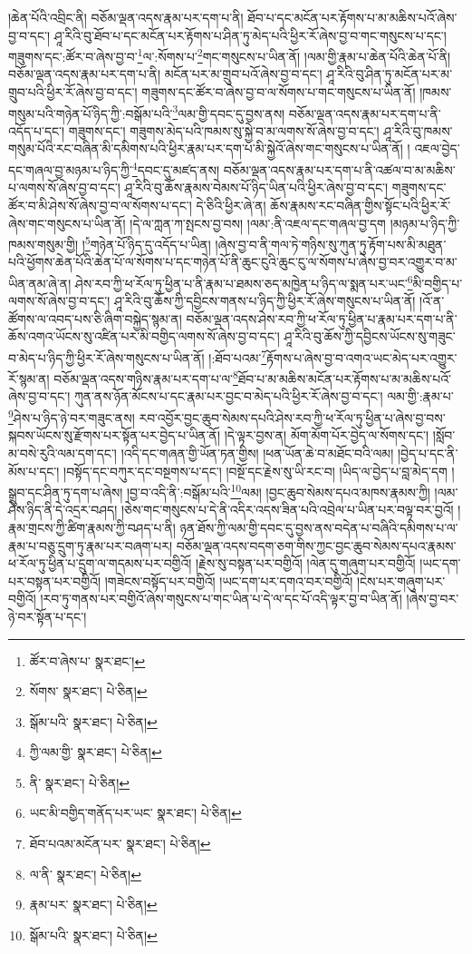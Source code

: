 །ཆེན་པོའི་འབྲིང་ནི། བཅོམ་ལྡན་འདས་རྣམ་པར་དག་པ་ནི། ཐོབ་པ་དང་མངོན་པར་རྟོགས་པ་མ་མཆིས་པའོ་ཞེས་བྱ་བ་དང་། ཤཱ་རིའི་བུ་ཐོབ་པ་དང་མངོན་པར་རྟོགས་པ་ཤིན་ཏུ་མེད་པའི་ཕྱིར་རོ་ཞེས་བྱ་བ་གང་གསུངས་པ་དང་། གཟུགས་དང་:ཚོར་བ་ཞེས་བྱ་བ་\footnote{ཚོར་བ་ཞེས་པ་  སྣར་ཐང་། }ལ་:སོགས་པ་\footnote{སོགས་  སྣར་ཐང་།  པེ་ཅིན། }གང་གསུངས་པ་ཡིན་ནོ། །ལམ་གྱི་རྣམ་པ་ཆེན་པོའི་ཆེན་པོ་ནི། བཅོམ་ལྡན་འདས་རྣམ་པར་དག་པ་ནི། མངོན་པར་མ་གྲུབ་པའོ་ཞེས་བྱ་བ་དང་། ཤཱ་རིའི་བུ་ཤིན་ཏུ་མངོན་པར་མ་གྲུབ་པའི་ཕྱིར་རོ་ཞེས་བྱ་བ་དང་། གཟུགས་དང་ཚོར་བ་ཞེས་བྱ་བ་ལ་སོགས་པ་གང་གསུངས་པ་ཡིན་ནོ། །ཁམས་གསུམ་པའི་གཉེན་པོ་ཉིད་ཀྱི་:བསྒོམ་པའི་\footnote{སྒོམ་པའི་  སྣར་ཐང་།  པེ་ཅིན། }ལམ་གྱི་དབང་དུ་བྱས་ནས། བཅོམ་ལྡན་འདས་རྣམ་པར་དག་པ་ནི་འདོད་པ་དང་། གཟུགས་དང་། གཟུགས་མེད་པའི་ཁམས་སུ་སྐྱེ་བ་མ་ལགས་སོ་ཞེས་བྱ་བ་དང་། ཤཱ་རིའི་བུ་ཁམས་གསུམ་པོའི་རང་བཞིན་མི་དམིགས་པའི་ཕྱིར་རྣམ་པར་དག་པ་མི་སྐྱེའོ་ཞེས་གང་གསུངས་པ་ཡིན་ནོ། །
འཇལ་བྱེད་དང་གཞལ་བྱ་མཉམ་པ་ཉིད་ཀྱི་\footnote{ཀྱི་ལམ་གྱི་  སྣར་ཐང་།  པེ་ཅིན། }དབང་དུ་མཛད་ནས། བཅོམ་ལྡན་འདས་རྣམ་པར་དག་པ་ནི་འཚལ་བ་མ་མཆིས་པ་ལགས་སོ་ཞེས་བྱ་བ་དང་། ཤཱ་རིའི་བུ་ཆོས་རྣམས་བེམས་པོ་ཉིད་ཡིན་པའི་ཕྱིར་ཞེས་བྱ་བ་དང་། གཟུགས་དང་ཚོར་བ་མི་ཤེས་སོ་ཞེས་བྱ་བ་ལ་སོགས་པ་དང་། དེ་ཅིའི་ཕྱིར་ཞེ་ན། ཆོས་རྣམས་རང་བཞིན་གྱིས་སྟོང་པའི་ཕྱིར་རོ་ཞེས་གང་གསུངས་པ་ཡིན་ནོ། །དེ་ལ་ཀླན་ཀ་སྤངས་བྱ་བས། །ལམ་:ནི་འཇལ་དང་གཞལ་བྱ་དག །མཉམ་པ་ཉིད་ཀྱི་ཁམས་གསུམ་གྱི། །\footnote{ནི་  སྣར་ཐང་།  པེ་ཅིན། }གཉེན་པོ་ཉིད་དུ་འདོད་པ་ཡིན། །ཞེས་བྱ་བ་ནི་གལ་ཏེ་གཉིས་སུ་ཀུན་ཏུ་རྟོག་པས་མི་མཐུན་པའི་ཕྱོགས་ཆེན་པོའི་ཆེན་པོ་ལ་སོགས་པ་དང་གཉེན་པོ་ནི་ཆུང་ངུའི་ཆུང་ངུ་ལ་སོགས་པ་ཞེས་བྱ་བར་འགྱུར་བ་མ་ཡིན་ནམ་ཞེ་ན། ཤེས་རབ་ཀྱི་ཕ་རོལ་ཏུ་ཕྱིན་པ་ནི་རྣམ་པ་ཐམས་ཅད་མཁྱེན་པ་ཉིད་ལ་སྨན་པར་ཡང་\footnote{ཡང་མི་བགྱིད་གནོད་པར་ཡང་  སྣར་ཐང་།  པེ་ཅིན། }མི་བགྱིད་པ་ལགས་སོ་ཞེས་བྱ་བ་དང་། ཤཱ་རིའི་བུ་ཆོས་ཀྱི་དབྱིངས་གནས་པ་ཉིད་ཀྱི་ཕྱིར་རོ་ཞེས་གསུངས་པ་ཡིན་ནོ། །འོ་ན་ཚོགས་ལ་འབད་པས་ཅི་ཞིག་བསྐྱེད་སྙམ་ན། བཅོམ་ལྡན་འདས་ཤེས་རབ་ཀྱི་ཕ་རོལ་ཏུ་ཕྱིན་པ་རྣམ་པར་དག་པ་ནི་ཆོས་འགའ་ཡོངས་སུ་འཛིན་པར་མི་བགྱིད་ལགས་སོ་ཞེས་བྱ་བ་དང་། ཤཱ་རིའི་བུ་ཆོས་ཀྱི་དབྱིངས་ཡོངས་སུ་གཟུང་བ་མེད་པ་ཉིད་ཀྱི་ཕྱིར་རོ་ཞེས་གསུངས་པ་ཡིན་ནོ། །:ཐོབ་པའམ་\footnote{ཐོབ་པའམ་མངོན་པར་  སྣར་ཐང་།  པེ་ཅིན། }རྟོགས་པ་ཞེས་བྱ་བ་འགའ་ཡང་མེད་པར་འགྱུར་རོ་སྙམ་ན། བཅོམ་ལྡན་འདས་གཉིས་རྣམ་པར་དག་པ་ལ་\footnote{ལ་ནི་  སྣར་ཐང་།  པེ་ཅིན། }ཐོབ་པ་མ་མཆིས་མངོན་པར་རྟོགས་པ་མ་མཆིས་པའོ་ཞེས་བྱ་བ་དང་། ཀུན་ནས་ཉོན་མོངས་པ་དང་རྣམ་པར་བྱང་བ་མེད་པའི་ཕྱིར་རོ་ཞེས་བྱ་བ་དང་། ལམ་གྱི་:རྣམ་པ་\footnote{རྣམ་པར་  སྣར་ཐང་།  པེ་ཅིན། }ཤེས་པ་ཉིད་ཉེ་བར་གཟུང་ནས། རབ་འབྱོར་བྱང་ཆུབ་སེམས་དཔའི་ཤེས་རབ་ཀྱི་ཕ་རོལ་ཏུ་ཕྱིན་པ་ཞེས་བྱ་བས་སྐབས་ཡོངས་སུ་རྫོགས་པར་སྟོན་པར་བྱེད་པ་ཡིན་ནོ། །དེ་ལྟར་བྱས་ན། མོག་མོག་པོར་བྱེད་ལ་སོགས་དང་། །སློབ་མ་བསེ་རུའི་ལམ་དག་དང་། །འདི་དང་གཞན་གྱི་ཡོན་ཏན་གྱིས། །ཕན་ཡོན་ཆེ་བ་མཐོང་བའི་ལམ། །བྱེད་པ་དང་ནི་མོས་པ་དང་། །བསྟོད་དང་བཀུར་དང་བསྔགས་པ་དང་། །བསྔོ་དང་རྗེས་སུ་ཡི་རང་བ། །ཡིད་ལ་བྱེད་པ་བླ་མེད་དག །སྒྲུབ་དང་ཤིན་ཏུ་དག་པ་ཞེས། །བྱ་བ་འདི་ནི་:བསྒོམ་པའི་\footnote{སྒོམ་པའི་  སྣར་ཐང་།  པེ་ཅིན། }ལམ། །བྱང་ཆུབ་སེམས་དཔའ་མཁས་རྣམས་ཀྱི། །ལམ་ཤེས་ཉིད་ནི་དེ་འདྲར་བཤད། །ཅེས་གང་གསུངས་པ་དེ་ནི་འདིར་འདས་ཟིན་པའི་འབྲེལ་པ་ཡིན་པར་བལྟ་བར་བྱའོ། །རྣམ་གྲངས་ཀྱི་ཚིག་རྣམས་ཀྱི་བཤད་པ་ནི། ཉན་ཐོས་ཀྱི་ལམ་གྱི་དབང་དུ་བྱས་ནས་བདེན་པ་བཞིའི་དམིགས་པ་ལ་རྣམ་པ་བཅུ་དྲུག་ཏུ་རྣམ་པར་བཞག་པར། བཅོམ་ལྡན་འདས་བདག་ཅག་གིས་ཀྱང་བྱང་ཆུབ་སེམས་དཔའ་རྣམས་ཕ་རོལ་ཏུ་ཕྱིན་པ་དྲུག་ལ་གདམས་པར་བགྱིའོ། །རྗེས་སུ་བསྟན་པར་བགྱིའོ། །ལེན་དུ་གཞུག་པར་བགྱིའོ། །ཡང་དག་པར་བསྟན་པར་བགྱིའོ། །གཟེངས་བསྟོད་པར་བགྱིའོ། །ཡང་དག་པར་དགའ་བར་བགྱིའོ། །ངེས་པར་གཞུག་པར་བགྱིའོ། །རབ་ཏུ་གནས་པར་བགྱིའོ་ཞེས་གསུངས་པ་གང་ཡིན་པ་དེ་ལ་དང་པོ་འདི་ལྟར་བྱ་བ་ཡིན་ནོ། །ཞེས་བྱ་བར་ཉེ་བར་སྟོན་པ་དང་། 